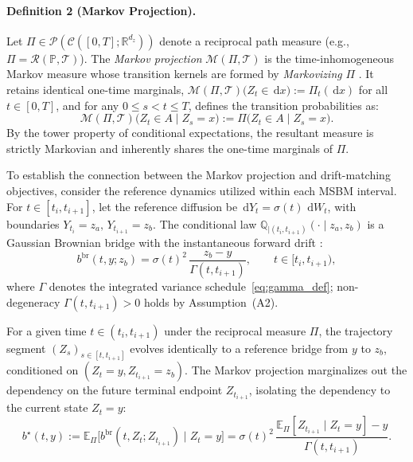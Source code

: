 \documentclass[review,onefignum,onetabnum]{siamart250211}
\newcommand{\E}{\mathbb{E}}
\newcommand{\R}{\mathbb{R}}
\newcommand{\dd}{\,\mathrm{d}}
\newcommand{\1}{\mathbf{1}}
\newcommand{\cP}{\mathcal{P}}
\begin{document}
\paragraph{Definition 2 (Markov Projection).}
Let $\Pi \in \cP(\mathcal{C}([0,T];\R^{d_z}))$ denote a reciprocal path measure (e.g., $\Pi = \mathcal{R}(\mathbb{P}, \mathcal{T})$). The \emph{Markov projection} $\mathcal{M}(\Pi, \mathcal{T})$ is the time-inhomogeneous Markov measure whose transition kernels are formed by \emph{Markovizing} $\Pi$ \cite{peluchetti2023, shi2024sbm}. It retains identical one-time marginals, $\mathcal{M}(\Pi, \mathcal{T})\big(Z_t \in \dd x\big) := \Pi_t(\dd x)$ for all $t\in[0,T]$, and for any $0\le s < t\le T$, defines the transition probabilities as:
\begin{equation}
\mathcal{M}(\Pi, \mathcal{T})\big(Z_t \in A \mid Z_s = x\big) := \Pi\big(Z_t \in A \mid Z_s = x\big).
\end{equation}
By the tower property of conditional expectations, the resultant measure is strictly Markovian and inherently shares the one-time marginals of $\Pi$.

To establish the connection between the Markov projection and drift-matching objectives, consider the reference dynamics utilized within each \textsc{MSBM} interval. For $t \in [t_i, t_{i+1}]$, let the reference diffusion be $\dd Y_t = \sigma(t) \, \dd W_t$, with boundaries $Y_{t_i} = z_a, \, Y_{t_{i+1}} = z_b$. The conditional law $\mathbb{Q}_{\mid (t_i,t_{i+1})}(\cdot \mid z_a, z_b)$ is a Gaussian Brownian bridge with the instantaneous forward drift \cite{park2025msbm}: 
\begin{equation}
b^{\mathrm{br}}(t, y; z_b) = \sigma(t)^2 \, \frac{z_b - y}{\Gamma(t, t_{i+1})}, \qquad t \in [t_i, t_{i+1}),
\end{equation}
where $\Gamma$ denotes the integrated variance schedule~\eqref{eq:gamma_def}; non-degeneracy $\Gamma(t,t_{i+1})>0$ holds by Assumption~(A2).

For a given time $t \in (t_i, t_{i+1})$ under the reciprocal measure $\Pi$, the trajectory segment $(Z_s)_{s \in [t, t_{i+1}]}$ evolves identically to a reference bridge from $y$ to $z_b$, conditioned on $(Z_t = y, Z_{t_{i+1}} = z_b)$. The Markov projection marginalizes out the dependency on the future terminal endpoint $Z_{t_{i+1}}$, isolating the dependency to the current state $Z_t = y$:
\begin{equation}
b^\star(t, y) := \E_{\Pi}\!\big[b^{\mathrm{br}}(t, Z_t; Z_{t_{i+1}}) \mid Z_t = y\big] = \sigma(t)^2 \, \frac{\E_{\Pi}[Z_{t_{i+1}} \mid Z_t = y] - y}{\Gamma(t, t_{i+1})}.
\end{equation}
\end{document}

